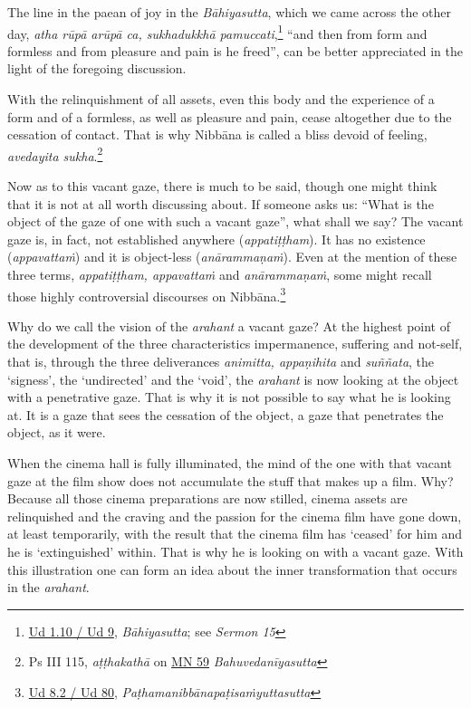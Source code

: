 The line in the paean of joy in the \emph{Bāhiyasutta}, which we came across the other day, \emph{atha rūpā arūpā ca, sukhadukkhā pamuccati},\footnote{\href{https://suttacentral.net/ud1.10/pli/ms}{Ud 1.10 / Ud 9}, \emph{Bāhiyasutta}; see \emph{Sermon 15}} ``and then from form and formless and from pleasure and pain is he freed'', can be better appreciated in the light of the foregoing discussion.

With the relinquishment of all assets, even this body and the experience of a form and of a formless, as well as pleasure and pain, cease altogether due to the cessation of contact. That is why Nibbāna is called a bliss devoid of feeling, \emph{avedayita sukha}.\footnote{Ps III 115, \emph{aṭṭhakathā} on \href{https://suttacentral.net/mn59/pli/ms}{MN 59} \emph{Bahuvedanīyasutta}}

Now as to this vacant gaze, there is much to be said, though one might think that it is not at all worth discussing about. If someone asks us: ``What is the object of the gaze of one with such a vacant gaze'', what shall we say? The vacant gaze is, in fact, not established anywhere (\emph{appatiṭṭham}). It has no existence (\emph{appavattaṁ}) and it is object-less (\emph{anārammaṇaṁ}). Even at the mention of these three terms, \emph{appatiṭṭham, appavattaṁ} and \emph{anārammaṇaṁ}, some might recall those highly controversial discourses on Nibbāna.\footnote{\href{https://suttacentral.net/ud8.2/pli/ms}{Ud 8.2 / Ud 80}, \emph{Paṭhamanibbānapaṭisaṁyuttasutta}}

Why do we call the vision of the \emph{arahant} a vacant gaze? At the highest point of the development of the three characteristics impermanence, suffering and not-self, that is, through the three deliverances \emph{animitta, appaṇihita} and \emph{suññata}, the `signess', the `undirected' and the `void', the \emph{arahant} is now looking at the object with a penetrative gaze. That is why it is not possible to say what he is looking at. It is a gaze that sees the cessation of the object, a gaze that penetrates the object, as it were.

When the cinema hall is fully illuminated, the mind of the one with that vacant gaze at the film show does not accumulate the stuff that makes up a film. Why? Because all those cinema preparations are now stilled, cinema assets are relinquished and the craving and the passion for the cinema film have gone down, at least temporarily, with the result that the cinema film has `ceased' for him and he is `extinguished' within. That is why he is looking on with a vacant gaze. With this illustration one can form an idea about the inner transformation that occurs in the \emph{arahant}.

